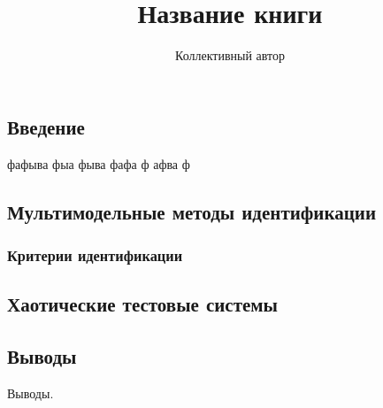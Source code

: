 \documentclass[a4paper,13pt,atutfonts]{cmonogra}
\title{Название книги}
\author{Коллективный автор}
\begin{document}
\sloppy

\tableofcontents



\subsection*{Введение}

фафыва фыа фыва фафа ф афва ф

\subsection*{Мультимодельные методы идентификации}

\subsubsection*{Критерии идентификации}



\subsection*{Хаотические тестовые системы }


% 












\subsection*{Выводы}

Выводы.
\label{e:atu}


\printbibliography

\FloatBarrier
\end{document}
